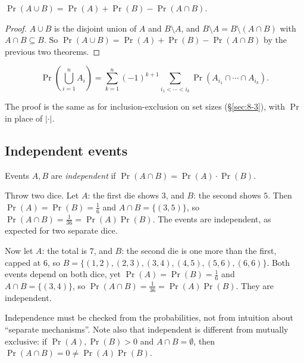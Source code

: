 \begin{proposition}
$\Pr(A\cup B) = \Pr(A)+\Pr(B)-\Pr(A\cap B)$.
\end{proposition}
\begin{proof}
$A\cup B$ is the disjoint union of $A$ and $B\setminus A$, and $B\setminus A=B\setminus(A\cap B)$ with $A\cap B\subseteq B$. So $\Pr(A\cup B)=\Pr(A)+\Pr(B)-\Pr(A\cap B)$ by the previous two theorems.
\end{proof}

\begin{theorem}
\[
\Pr\left(\bigcup_{i=1}^n A_i\right) = \sum_{k=1}^n (-1)^{k+1}\sum_{i_1<\cdots<i_k} \Pr(A_{i_1}\cap\cdots\cap A_{i_k}).
\]
\end{theorem}

\begin{note}
The proof is the same as for inclusion-exclusion on set sizes (\S\ref{sec:8-3}), with $\Pr$ in place of $|\cdot|$.
\end{note}

\subsection{Independent events}
\label{sec:9-7}

\begin{definition}[Independent]
Events $A,B$ are \emph{independent} if $\Pr(A\cap B) = \Pr(A)\cdot\Pr(B)$.
\end{definition}

\begin{example}
Throw two dice. Let $A$: the first die shows $3$, and $B$: the second shows $5$. Then $\Pr(A)=\Pr(B)=\frac16$ and $A\cap B=\{(3,5)\}$, so $\Pr(A\cap B)=\frac1{36}=\Pr(A)\Pr(B)$. The events are independent, as expected for two separate dice.
\end{example}

\begin{example}
Now let $A$: the total is $7$, and $B$: the second die is one more than the first, capped at $6$, so $B=\{(1,2),(2,3),(3,4),(4,5),(5,6),(6,6)\}$. Both events depend on both dice, yet $\Pr(A)=\Pr(B)=\frac16$ and $A\cap B=\{(3,4)\}$, so $\Pr(A\cap B)=\frac1{36}=\Pr(A)\Pr(B)$. They are independent.
\end{example}

\begin{note}
Independence must be checked from the probabilities, not from intuition about ``separate mechanisms''. Note also that independent is different from mutually exclusive: if $\Pr(A),\Pr(B)>0$ and $A\cap B=\emptyset$, then $\Pr(A\cap B)=0\ne\Pr(A)\Pr(B)$.
\end{note}

